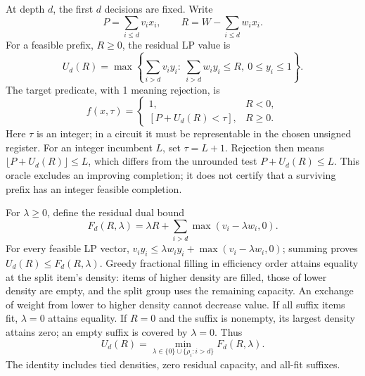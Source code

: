 \documentclass[referee,pdflatex,sn-mathphys-num]{sn-jnl}
\theoremstyle{thmstyleone}
\theoremstyle{thmstyletwo}
\begin{document}
At depth $d$, the first $d$ decisions are fixed. Write
\begin{equation}
 P=\sum_{i\leq d}v_ix_i,\qquad R=W-\sum_{i\leq d}w_ix_i.
\end{equation}
For a feasible prefix, $R\geq0$, the residual LP value is
\begin{equation}\label{eq:lp}
 U_d(R)=\max\left\{\sum_{i>d}v_i y_i:\ \sum_{i>d}w_i y_i\leq R,\ 0\leq y_i\leq1\right\}.
\end{equation}
The target predicate, with 1 meaning rejection, is
\begin{equation}\label{eq:predicate}
 f(x,\tau)=\begin{cases}
 1,&R<0,\\
 [P+U_d(R)<\tau],&R\geq0.
 \end{cases}
\end{equation}
Here $\tau$ is an integer; in a circuit it must be representable in the chosen unsigned register. For an integer incumbent $L$, set $\tau=L+1$. Rejection then means $\lfloor P+U_d(R)\rfloor\leq L$, which differs from the unrounded test $P+U_d(R)\leq L$. This oracle excludes an improving completion; it does not certify that a surviving prefix has an integer feasible completion.

For $\lambda\geq0$, define the residual dual bound
\begin{equation}\label{eq:dual}
 F_d(R,\lambda)=\lambda R+\sum_{i>d}\max(v_i-\lambda w_i,0).
\end{equation}
For every feasible LP vector, $v_i y_i\leq\lambda w_i y_i+\max(v_i-\lambda w_i,0)$; summing proves $U_d(R)\leq F_d(R,\lambda)$. Greedy fractional filling in efficiency order attains equality at the split item's density: items of higher density are filled, those of lower density are empty, and the split group uses the remaining capacity. An exchange of weight from lower to higher density cannot decrease value. If all suffix items fit, $\lambda=0$ attains equality. If $R=0$ and the suffix is nonempty, its largest density attains zero; an empty suffix is covered by $\lambda=0$. Thus
\begin{equation}\label{eq:dualequality}
 U_d(R)=\min_{\lambda\in\{0\}\cup\{\rho_i:i>d\}}F_d(R,\lambda).
\end{equation}
The identity includes tied densities, zero residual capacity, and all-fit suffixes.
\end{document}
